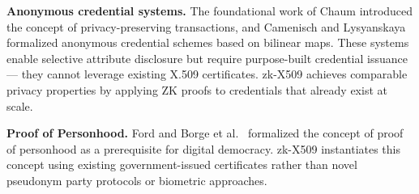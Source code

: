 \documentclass[11pt, a4paper]{article}
\begin{document}
\textbf{Anonymous credential systems.} The foundational work of Chaum
\cite{ref19} introduced the concept of privacy-preserving transactions, and
Camenisch and Lysyanskaya \cite{ref18} formalized anonymous credential
schemes based on bilinear maps. These systems enable selective attribute
disclosure but require purpose-built credential issuance --- they cannot
leverage existing X.509 certificates. zk-X509 achieves comparable
privacy properties by applying ZK proofs to credentials that already
exist at scale.

\textbf{Proof of Personhood.} Ford \cite{ref20} and Borge et al.~\cite{ref21}
formalized the concept of proof of personhood as a prerequisite for
digital democracy. zk-X509 instantiates this concept using existing
government-issued certificates rather than novel pseudonym party
protocols or biometric approaches.
\end{document}
